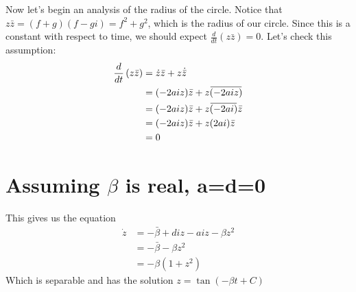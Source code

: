 \documentclass[10pt]{article}
\newcommand{\overbar}[1]{\mkern 1.5mu\overline{\mkern-1.5mu#1\mkern-1.5mu}\mkern 1.5mu}
\begin{document}
Now let's begin an analysis of the radius of the circle.
Notice that $z\bar z=(f+g)(f-gi)=f^2+g^2$, which is the radius of our circle. 
Since this is a constant with respect to time, we should expect $\frac{d}{dt}\left(z\bar z\right)=0$.
Let's check this assumption:
\begin{align*}
\frac{d}{dt}\left(z\bar z\right)&=\dot z\bar z+z\dot {\bar z}\\
&=(-2aiz)\bar z+z\overbar{(-2aiz)}\\
&=(-2aiz)\bar z+z\overbar{(-2ai)}\bar z\\
&=(-2aiz)\bar z+z(2ai)\bar z\\
&=0
\end{align*}

\section{Assuming $\beta$ is real, a=d=0}
This gives us the equation
\begin{align*}
\dot z&=-\bar\beta+diz-aiz-\beta z^2\\
&=-\bar\beta-\beta z^2\\
&=-\beta(1+z^2)
\end{align*}
Which is separable and has the solution $z=\tan(-\beta t+C)$
\end{document}
